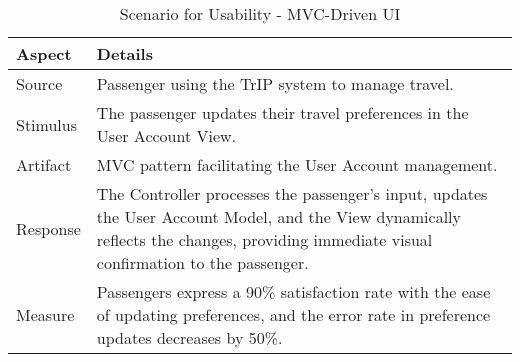 \begin{table}[H]
    \centering
    \begin{tabularx}{\textwidth}{@{} lX @{}}
    \toprule
    \textbf{Aspect} & \textbf{Details} \\
    \midrule
    Source & Passenger using the TrIP system to manage travel. \\
    Stimulus & The passenger updates their travel preferences in the User Account View. \\
    Artifact & MVC pattern facilitating the User Account management. \\
    Response & The Controller processes the passenger's input, updates the User Account Model, and the View dynamically reflects the changes, providing immediate visual confirmation to the passenger. \\
    Measure & Passengers express a 90\% satisfaction rate with the ease of updating preferences, and the error rate in preference updates decreases by 50\%. \\
    \bottomrule
    \end{tabularx}
    \caption{Scenario for Usability - MVC-Driven UI}
    \label{table:mvc_usability}
\end{table}
